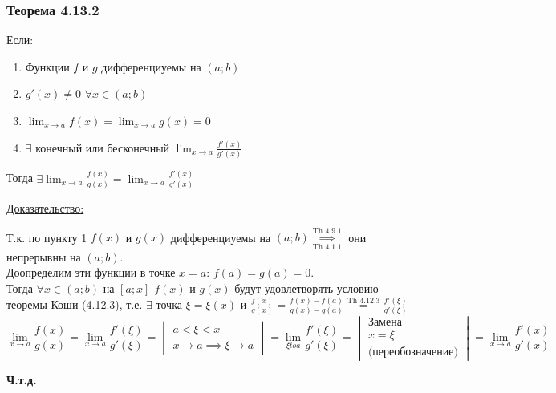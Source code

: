\documentclass[12pt]{article}
\begin{document}
    \subsubsection*{Теорема 4.13.2}\label{th:4.13.2}
    \noindent Если: \begin{enumerate}
        \item Функции $f$ и $g$ дифференциуемы на $(a;b)$
        \item $g'(x) \ne 0$ $\forall x \in (a;b)$
        \item $\lim_{x\to a} f(x) = \lim_{x\to a}g(x) = 0$
        \item $\exists$ конечный или бесконечный $\lim_{x\to a} \frac{f'(x)}{g'(x)}$
    \end{enumerate}
    Тогда $\exists \lim_{x\to a}\frac{f(x)}{g(x)} = \lim_{x\to a}\frac{f'(x)}{g'(x)}$\par\noindent
    \underline{Доказательство:}
    \begin{adjustwidth}{1.5em}{1.5em}
        Т.к. по пункту 1 $f(x)$ и $g(x)$ дифференциуемы на $(a;b) \underset{\hyperref[th:4.1.1]{\text{Th 4.1.1}}}{\overset{\hyperref[th:4.9.1]{\text{Th 4.9.1}}}{\implies}}$ они непрерывны на $(a; b)$.\\
        Доопределим эти функции в точке $x = a$: $f(a) = g(a) = 0$.\\
        Тогда $\forall x \in (a; b)$ на $[a; x]$ $f(x)$ и $g(x)$ будут удовлетворять условию \hyperref[th:4.12.3]{теоремы Коши (4.12.3)}, т.е. $\exists$ точка $\xi = \xi(x)$ и $\frac{f(x)}{g(x)} = \frac{f(x) - f(a)}{g(x) - g(a)} \overset{\hyperref[th:4.12.3]{\text{Th 4.12.3}}}{=} \frac{f'(\xi)}{g'(\xi)}$
        \[ \boxed{\lim_{x \to a}\frac{f(x)}{g(x)}} = \lim_{x\to a}\frac{f'(\xi)}{g'(\xi)} = \begin{vmatrix}
            a < \xi < x\\
            x \to a \implies \xi \to a
        \end{vmatrix} = \lim_{\xi to a} \frac{f'(\xi)}{g'(\xi)} = \begin{vmatrix}
            \text{Замена}\\
            x = \xi\\
            \text{(переобозначение)}
        \end{vmatrix} = \boxed{\lim_{x\to a}\frac{f'(x)}{g'(x)}} \]
        \begin{center}
            \textbf{Ч.т.д.}
        \end{center}
    \end{adjustwidth}
\end{document}
